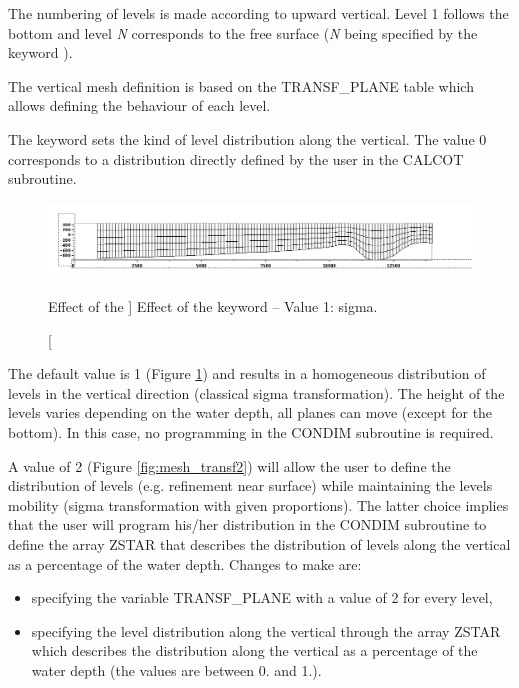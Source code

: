 The numbering of levels is made according to upward vertical. Level 1 follows
the bottom and level \textit{N} corresponds to the free surface (\textit{N}
being specified by the keyword ).

The vertical mesh definition is based on the TRANSF\_PLANE table which allows
defining the behaviour of each level.

The keyword  sets the kind of level distribution
along the vertical. The value 0 corresponds to a distribution directly defined
by the user in the CALCOT subroutine.

\begin{figure}[H]%
\begin{center}
%
  \includegraphics[width=\textwidth]{./graphics/mesh_transformation}
%
\end{center}
\caption
[Effect of the ]
{Effect of the  keyword -- Value 1: sigma.}
\label{fig:mesh_transf}
\end{figure}

The default value is 1 (Figure \ref{fig:mesh_transf}) and results in a
homogeneous distribution of levels in the vertical direction (classical sigma
transformation). The height of the levels varies depending on the water depth,
all planes can move (except for the bottom). In this case, no programming in
the CONDIM subroutine is required.

A value of 2 (Figure \ref{fig:mesh_transf2}) will allow the user to define the
distribution of levels (e.g. refinement near surface) while maintaining the
levels mobility (sigma transformation with given proportions). The latter
choice implies that the user will program his/her distribution in the CONDIM
subroutine to define the array ZSTAR that describes the distribution of levels
along the vertical as a percentage of the water depth.  Changes to make are:

\begin{itemize}
\item specifying the variable TRANSF\_PLANE with a value of 2 for every level,

\item specifying the level distribution along the vertical through the array
ZSTAR which describes the distribution along the vertical as a percentage
of the water depth (the values are between 0. and 1.).
\end{itemize}

